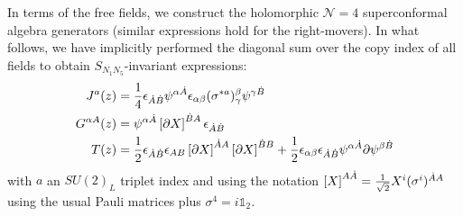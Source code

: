 \documentclass[11pt]{amsart}
\newcommand{\mbb}{\mathbb}
\newcommand{\mc}{\mathcal}
\theoremstyle{thm}
\numberwithin{equation}{subsection}
\theoremstyle{def}
\theoremstyle{rem}
\begin{document}
In terms of the free fields, we construct the holomorphic $\mc N=4$ superconformal algebra generators (similar expressions hold for the right-movers). In what follows, we have implicitly performed the diagonal sum over the copy index of all fields to obtain $S_{N_1 N_5}$-invariant expressions:
\begin{align*}
J^{a}(z) &= {1 \over 4} \epsilon_{\dot{A} \dot{B}} \psi^{\alpha \dot{A}}\epsilon_{\alpha\beta}(\sigma^{* a})^{\beta}_{\gamma} \psi^{\gamma \dot{B}}\\
G^{\alpha A}(z) &= \psi^{\alpha \dot{A}}\left[\partial X \right]^{\dot{B}A}\epsilon_{\dot{A} \dot{B}}\\
T(z) &= {1 \over 2} \epsilon_{\dot{A}\dot{B}}\epsilon_{AB}\left[\partial X\right]^{\dot{A}A}\left[\partial X \right]^{\dot{B}B} + {1\over 2}\epsilon_{\alpha \beta}\epsilon_{\dot{A}\dot{B}} \psi^{\alpha \dot{A}}\partial \psi^{\beta \dot{B}}
\end{align*} with $a$ an $SU(2)_L$ triplet index and using the notation $\left[ X \right]^{A \dot{A}} = {1 \over \sqrt{2}}X^i (\sigma^i)^{\dot{A} A}$ using the usual Pauli matrices plus $\sigma^4 = i \mbb 1_2$.
\end{document}
